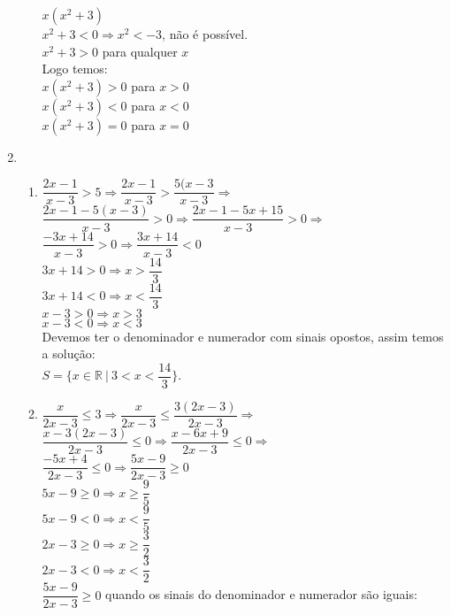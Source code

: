 \begin{enumerate}
\begin{enumerate}
		$x(x^2 + 3)$\\
		$x^2 + 3 < 0 \Rightarrow x^2 < -3$, não é possível.\\
		$x^2 + 3 > 0$ para qualquer $x$\\
		Logo temos: \\
		$x(x^2 + 3) > 0$ para $x > 0$\\
		$x(x^2 + 3) < 0$ para $x < 0$\\
		$x(x^2 + 3) = 0$ para $x = 0$\\		
		\end{enumerate}
	\item
		\begin{enumerate}\addtocounter{enumii}{7}
			\item
			$\dfrac{2x - 1}{x - 3} > 5 \Rightarrow \dfrac{2x - 1}{x - 3} > \dfrac{5(x - 3}{x - 3}\Rightarrow $\\[6pt]
			$\dfrac{2x - 1 - 5(x - 3)}{x - 3} > 0 \Rightarrow \dfrac{2x - 1 - 5x + 15}{x - 3} > 0 \Rightarrow $\\[6pt]
			$\dfrac{-3x + 14}{x - 3} > 0 \Rightarrow \dfrac{3x + 14}{x - 3} < 0$\\[6pt]
			$3x + 14 > 0 \Rightarrow x > \dfrac{14}{3}$\\[6pt]
			$3x + 14 < 0 \Rightarrow x < \dfrac{14}{3}$\\[6pt]
			$x - 3 > 0 \Rightarrow x > 3$\\
			$x - 3 < 0 \Rightarrow x < 3$\\
			Devemos ter o denominador e numerador com sinais opostos, assim temos a solução:\\
			$S =  \lbrace x \in \mathbb{R} \ |\ 3 < x < \dfrac{14}{3} \rbrace$.
			\item
			$\dfrac{x}{2x - 3}\leq 3 \Rightarrow \dfrac{x}{2x - 3} \leq \dfrac{3(2x - 3)}{2x - 3} \Rightarrow$\\[6pt]
			$\dfrac{x - 3(2x - 3)}{2x - 3} \leq 0 \Rightarrow \dfrac{x - 6x + 9}{2x - 3} \leq 0 \Rightarrow $\\[6pt]
			$\dfrac{-5x + 4}{2x - 3} \leq 0 \Rightarrow \dfrac{5x - 9}{2x - 3} \geq 0 $\\[6pt]
			$5x - 9 \geq 0 \Rightarrow x \geq \dfrac{9}{5}$\\[6pt]
			$5x - 9 < 0 \Rightarrow x < \dfrac{9}{5}$\\[6pt]
			$2x - 3 \geq 0 \Rightarrow x \geq \dfrac{3}{2}$\\[6pt]
			$2x - 3 < 0 \Rightarrow x < \dfrac{3}{2}$\\[6pt]
			$\dfrac{5x - 9}{2x - 3} \geq 0$  quando os sinais do denominador e numerador são iguais:\\[6pt]

\end{enumerate}
\end{enumerate}
